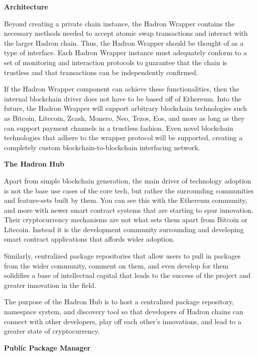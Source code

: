 \documentclass{%
	article}
\begin{document}
\begin{center}
\textbf{Architecture}
\end{center}

Beyond creating a private chain instance, the Hadron Wrapper contains the necessary methods needed to accept atomic swap transactions and interact with the larger Hadron chain. Thus, the Hadron Wrapper should be thought of as a type of interface. Each Hadron Wrapper instance must adequately conform to a set of monitoring and interaction protocols to guarantee that the chain is trustless and that transactions can be independently confirmed.

If the Hadron Wrapper component can achieve these functionalities, then the internal blockchain driver does not have to be based off of Ethereum. Into the future, the Hadron Wrapper will support arbitrary blockchain technologies such as Bitcoin, Litecoin, Zcash, Monero, Neo, Tezos, Eos, and more as long as they can support payment channels in a trustless fashion. Even novel blockchain technologies that adhere to the wrapper protocol will be supported, creating a completely custom blockchain-to-blockchain interfacing network.

\begin{center}
\textbf{The Hadron Hub}
\end{center}

Apart from simple blockchain generation, the main driver of technology adoption is not the base use cases of the core tech, but rather the surrounding communities and feature-sets built by them. You can see this with the Ethereum community, and more with newer smart contract systems that are starting to spur innovation. Their cryptocurrency mechanisms are not what sets them apart from Bitcoin or Litecoin. Instead it is the development community surrounding and developing smart contract applications that affords wider adoption.

Similarly, centralized package repositories that allow users to pull in packages from the wider community, comment on them, and even develop for them solidifies a base of intellectual capital that leads to the success of the project and greater innovation in the field.

The purpose of the Hadron Hub is to host a centralized package repository, namespace system, and discovery tool so that developers of Hadron chains can connect with other developers, play off each other's innovations, and lead to a greater state of cryptocurrency.

\begin{center}
\textbf{Public Package Manager}
\end{center}
\end{document}
